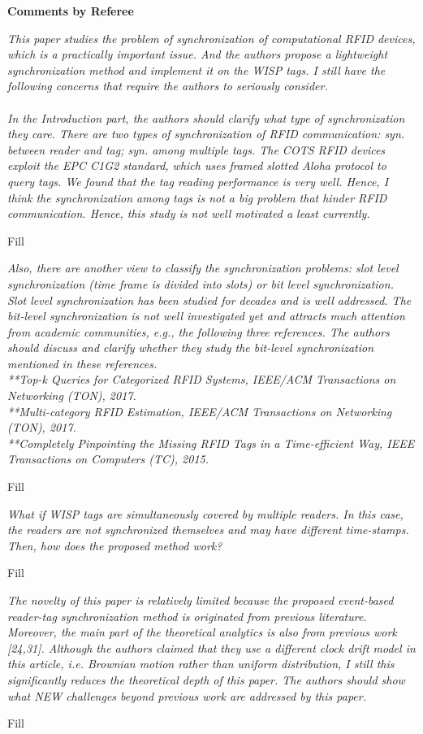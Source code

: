 \documentclass[10pt]{article}
\newcommand{\referee}[1]{{\item \color{OliveGreen} \emph{{#1}}}}
\newcommand{\response}[1]{{\color{blue} #1}}
\newcounter{refereeCounter}
\newenvironment{responses}{%
\refstepcounter{refereeCounter}%
\textbf{\large Comments by Referee \therefereeCounter}
\begin{enumerate}%
\renewcommand{\labelenumi}{\textbf{[R\therefereeCounter :\,\arabic{enumi}]}} %
}{\end{enumerate}}
\begin{document}
\begin{responses}
 
\referee{This paper studies the problem of synchronization of computational RFID devices, which is a practically important issue. And the authors propose a lightweight synchronization method and implement it on the WISP tags. I still have the following concerns that require the authors to seriously consider. \\
\\	
In the Introduction part, the authors should clarify what type of synchronization they care. There are two types of synchronization of RFID communication: syn. between reader and tag; syn. among multiple tags. The COTS RFID devices exploit the EPC C1G2 standard, which uses framed slotted Aloha protocol to query tags. We found that the tag reading performance is very well. Hence, I think the synchronization among tags is not a big problem that hinder RFID communication. Hence, this study is not well motivated a least currently. }

\response{
	Fill
}

\referee{Also, there are another view to classify the synchronization problems: slot level synchronization (time frame is divided into slots) or bit level synchronization. Slot level synchronization has been studied for decades and is well addressed. The bit-level synchronization is not well investigated yet and attracts much attention from academic communities, e.g., the following three references. The authors should discuss and clarify whether they study the bit-level synchronization mentioned in these references. \\
**Top-k Queries for Categorized RFID Systems, IEEE/ACM Transactions on Networking (TON), 2017. \\
**Multi-category RFID Estimation, IEEE/ACM Transactions on Networking (TON), 2017. \\
**Completely Pinpointing the Missing RFID Tags in a Time-efficient Way, IEEE Transactions on Computers (TC), 2015.}

\response{
	Fill
}

\referee{What if WISP tags are simultaneously covered by multiple readers. In this case, the readers are not synchronized themselves and may have different time-stamps. Then, how does the proposed method work?}

\response{
	Fill
}

\referee{The novelty of this paper is relatively limited because the proposed event-based reader-tag synchronization method is originated from previous literature. Moreover, the main part of the theoretical analytics is also from previous work [24,31]. Although the authors claimed that they use a different clock drift model in this article, i.e. Brownian motion rather than uniform distribution, I still this significantly reduces the theoretical depth of this paper. The authors should show what NEW challenges beyond previous work are addressed by this paper. }

\response{
	Fill
}

\end{responses}
\end{document}
